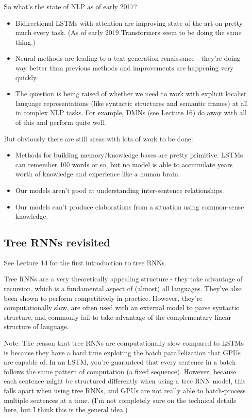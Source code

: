 So what's the state of NLP as of early 2017?
\begin{itemize}
\item Bidirectional LSTMs with attention are improving state of the art on pretty much every task. (As of early 2019 Transformers seem to be doing the same thing.)
\item Neural methods are leading to a text generation renaissance - they're doing way better than previous methods and improvements are happening very quickly.
\item The question is being raised of whether we need to work with explicit localist language representations (like syntactic structures and semantic frames) at all in complex NLP tasks. For example, DMNs (see Lecture 16) do away with all of this and perform quite well.
\end{itemize}
But obviously there are still areas with lots of work to be done:
\begin{itemize}
\item Methods for building memory/knowledge bases are pretty primitive. LSTMs can remember 100 words or so, but no model is able to accumulate years worth of knowledge and experience like a human brain.
\item Our models aren't good at understanding inter-sentence relationships.
\item Our models can't produce elaborations from a situation using common-sense knowledge.
\end{itemize}

\subsection{Tree RNNs revisited}
See Lecture 14 for the first introduction to tree RNNs.

Tree RNNs are a very theoretically appealing structure - they take advantage of recursion, which is a fundamental aspect of (almost) all languages. They've also been shown to perform competitively in practice. However, they're computationally slow, are often used with an external model to parse syntactic structure, and commonly fail to take advantage of the complementary linear structure of language. 

Note: The reason that tree RNNs are computationally slow compared to LSTMs is because they have a hard time exploting the batch parallelization that GPUs are capable of. In an LSTM, you're guaranteed that every sentence in a batch follows the same pattern of computation (a fixed sequence). However, because each sentence might be structured differently when using a tree RNN model, this falls apart when using tree RNNs, and GPUs are not really able to batch-process multiple sentences at a time. (I'm not completely sure on the technical details here, but I think this is the general idea.)

